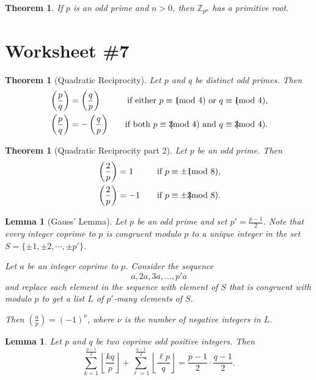 \documentclass[12pt]{amsart}
\newcommand{\Z}{\mathbb{Z}}
\numberwithin{equation}{section}
\theoremstyle{plain} %
\newtheorem{thm}	[section]	{Theorem}
\newtheorem{lem}	[section]	{Lemma}
\begin{document}
\begin{thm} If $p$ is an odd prime and $n>0$, then $\Z_{p^n}$ has a primitive root.
\end{thm}


\section*{Worksheet \#7}

\begin{thm}[Quadratic Reciprocity] Let $p$ and $q$ be distinct odd primes. Then
\[\begin{aligned} &\left( \frac{p}{q} \right) = \left( \frac{q}{p} \right) \quad &\text{if either} \ p\equiv 1\hspace{-3mm}\pmod 4 \ \text{or} \ q \equiv 1\hspace{-3mm}\pmod 4, \\
&\left( \frac{p}{q} \right) =- \left( \frac{q}{p} \right) \quad &\text{if both} \ p\equiv 3\hspace{-3mm}\pmod 4 \ \text{and} \ q\equiv 3\hspace{-3mm}\pmod 4. \end{aligned} \]
\end{thm}



\begin{thm}[Quadratic Reciprocity part 2] Let $p$ be an odd prime. Then
\[\begin{aligned} &\left( \frac{2}{p} \right) = 1 \quad &\text{if} \ p\equiv \pm 1\hspace{-3mm}\pmod 8,  \\
&\left( \frac{2}{p} \right) = -1 \quad &\text{if} \ p\equiv \pm 3\hspace{-3mm}\pmod 8.  \\ \end{aligned} \]
\end{thm}


\begin{lem}[Gauss' Lemma] Let $p$ be an odd prime and set $p' = \frac{p-1}{2}$. Note that every integer coprime to $p$ is congruent modulo $p$ to a unique integer  in the set $S= \{\pm1, \pm 2,\cdots, \pm p'\}$.

 Let $a$ be an integer coprime to $p$. Consider the sequence
\[ a, 2a, 3a, \dots, p'a \] and replace each element in the sequence with element of $S$ that is congruent with modulo $p$ to get a list $L$ of $p'$-many elements of $S$.

Then $\displaystyle \left( \frac{a}{p} \right) = (-1)^\nu$, where $\nu$ is the number of negative integers in $L$.
\end{lem}

\begin{lem} Let $p$ and $q$ be two coprime odd positive integers. Then 
\[ \sum_{k=1}^{\frac{p-1}{2}} \left \lfloor \frac{kq}{p} \right\rfloor + \sum_{\ell=1}^{\frac{q-1}{2}} \left \lfloor \frac{\ell p}{q} \right\rfloor = \frac{p-1}{2} \cdot \frac{q-1}{2}.\]
\end{lem}
\end{document}
